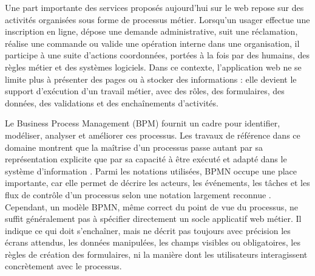 
Une part importante des services proposés aujourd'hui sur le web repose sur des activités organisées sous forme de processus métier. Lorsqu'un usager effectue une inscription en ligne, dépose une demande administrative, suit une réclamation, réalise une commande ou valide une opération interne dans une organisation, il participe à une suite d'actions coordonnées, portées à la fois par des humains, des règles métier et des systèmes logiciels. Dans ce contexte, l'application web ne se limite plus à présenter des pages ou à stocker des informations : elle devient le support d'exécution d'un travail métier, avec des rôles, des formulaires, des données, des validations et des enchaînements d'activités.


Le Business Process Management (BPM) fournit un cadre pour identifier, modéliser, analyser et améliorer ces processus. Les travaux de référence dans ce domaine montrent que la maîtrise d'un processus passe autant par sa représentation explicite que par sa capacité à être exécuté et adapté dans le système d'information \cite{dumas2018fundamentals,weske2012bpm}. Parmi les notations utilisées, BPMN occupe une place importante, car elle permet de décrire les acteurs, les événements, les tâches et les flux de contrôle d'un processus selon une notation largement reconnue \cite{omg2013bpmn}. Cependant, un modèle BPMN, même correct du point de vue du processus, ne suffit généralement pas à spécifier directement un socle applicatif web métier. Il indique ce qui doit s'enchaîner, mais ne décrit pas toujours avec précision les écrans attendus, les données manipulées, les champs visibles ou obligatoires, les règles de création des formulaires, ni la manière dont les utilisateurs interagissent concrètement avec le processus.

